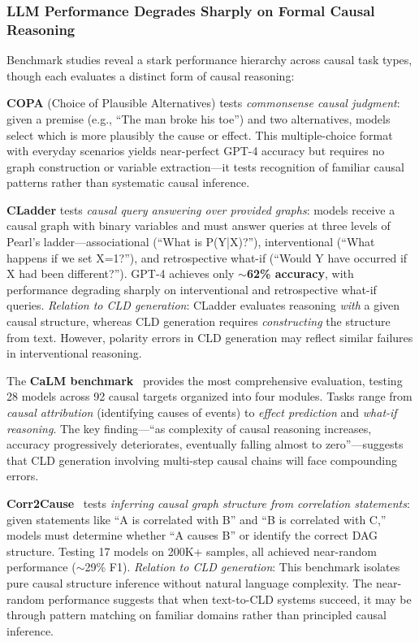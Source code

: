 \subsubsection{LLM Performance Degrades Sharply on Formal Causal Reasoning}

Benchmark studies reveal a stark performance hierarchy across causal task types, though each evaluates a distinct form of causal reasoning:

\textbf{COPA} (Choice of Plausible Alternatives) tests \textit{commonsense causal judgment}: given a premise (e.g., ``The man broke his toe'') and two alternatives, models select which is more plausibly the cause or effect. This multiple-choice format with everyday scenarios yields near-perfect GPT-4 accuracy but requires no graph construction or variable extraction---it tests recognition of familiar causal patterns rather than systematic causal inference.

\textbf{CLadder} \citep{jin2023cladder} tests \textit{causal query answering over provided graphs}: models receive a causal graph with binary variables and must answer queries at three levels of Pearl's ladder---associational (``What is P(Y|X)?''), interventional (``What happens if we set X=1?''), and retrospective what-if (``Would Y have occurred if X had been different?''). GPT-4 achieves only \textbf{$\sim$62\% accuracy}, with performance degrading sharply on interventional and retrospective what-if queries. \textit{Relation to CLD generation}: CLadder evaluates reasoning \textit{with} a given causal structure, whereas CLD generation requires \textit{constructing} the structure from text. However, polarity errors in CLD generation may reflect similar failures in interventional reasoning.

The \textbf{CaLM benchmark}~\citep{chen2024calm} provides the most comprehensive evaluation, testing 28 models across 92 causal targets organized into four modules. Tasks range from \textit{causal attribution} (identifying causes of events) to \textit{effect prediction} and \textit{what-if reasoning}. The key finding---``as complexity of causal reasoning increases, accuracy progressively deteriorates, eventually falling almost to zero''---suggests that CLD generation involving multi-step causal chains will face compounding errors.

\textbf{Corr2Cause}~\citep{jin2023corr2cause} tests \textit{inferring causal graph structure from correlation statements}: given statements like ``A is correlated with B'' and ``B is correlated with C,'' models must determine whether ``A causes B'' or identify the correct DAG structure. Testing 17 models on 200K+ samples, all achieved near-random performance ($\sim$29\% F1). \textit{Relation to CLD generation}: This benchmark isolates pure causal structure inference without natural language complexity. The near-random performance suggests that when text-to-CLD systems succeed, it may be through pattern matching on familiar domains rather than principled causal inference.

